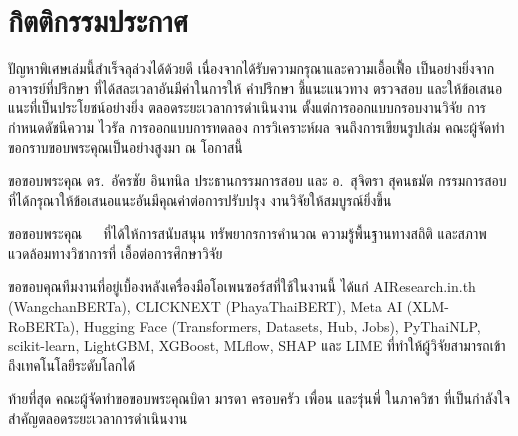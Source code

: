 \chapter*{กิตติกรรมประกาศ}

ปัญหาพิเศษเล่มนี้สำเร็จลุล่วงได้ด้วยดี เนื่องจากได้รับความกรุณาและความเอื้อเฟื้อ
เป็นอย่างยิ่งจาก \advisor{} อาจารย์ที่ปรึกษา ที่ได้สละเวลาอันมีค่าในการให้
คำปรึกษา ชี้แนะแนวทาง ตรวจสอบ และให้ข้อเสนอแนะที่เป็นประโยชน์อย่างยิ่ง
ตลอดระยะเวลาการดำเนินงาน ตั้งแต่การออกแบบกรอบงานวิจัย การกำหนดดัชนีความ
ไวรัล การออกแบบการทดลอง การวิเคราะห์ผล จนถึงการเขียนรูปเล่ม คณะผู้จัดทำ
ขอกราบขอบพระคุณเป็นอย่างสูงมา ณ โอกาสนี้

ขอขอบพระคุณ ดร.\ อัครชัย อินทนิล ประธานกรรมการสอบ และ อ.\ สุจิตรา
สุคนธมัต กรรมการสอบ ที่ได้กรุณาให้ข้อเสนอแนะอันมีคุณค่าต่อการปรับปรุง
งานวิจัยให้สมบูรณ์ยิ่งขึ้น

ขอขอบพระคุณ\department\ \school\ \university\ ที่ได้ให้การสนับสนุน
ทรัพยากรการคำนวณ ความรู้พื้นฐานทางสถิติ และสภาพแวดล้อมทางวิชาการที่
เอื้อต่อการศึกษาวิจัย

ขอขอบคุณทีมงานที่อยู่เบื้องหลังเครื่องมือโอเพนซอร์สที่ใช้ในงานนี้ ได้แก่
AIResearch.in.th (WangchanBERTa), CLICKNEXT (PhayaThaiBERT), Meta AI
(XLM-RoBERTa), Hugging Face (Transformers, Datasets, Hub, Jobs),
PyThaiNLP, scikit-learn, LightGBM, XGBoost, MLflow, SHAP และ LIME
ที่ทำให้ผู้วิจัยสามารถเข้าถึงเทคโนโลยีระดับโลกได้

ท้ายที่สุด คณะผู้จัดทำขอขอบพระคุณบิดา มารดา ครอบครัว เพื่อน และรุ่นพี่
ในภาควิชา ที่เป็นกำลังใจสำคัญตลอดระยะเวลาการดำเนินงาน

\vspace{1.5cm}
\begin{flushright}
\authorone\\
\authortwo\\
\authorthree
\end{flushright}
\newpage
